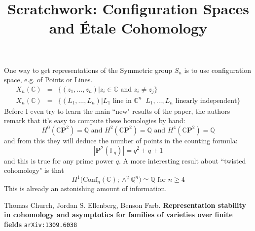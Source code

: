 \documentclass[12pt]{article}
\title{Scratchwork: Configuration Spaces and \'{E}tale Cohomology}
\date{}
\begin{document}
\sffamily

\maketitle

\noindent One way to get representations of the Symmetric group $S_n$ is to use configuration space, e.g. of Points or Lines.
\begin{eqnarray*}
X_n(\mathbb{C}) &=& \big\{ (z_1, \dots, z_n) \big| z_i \in \mathbb{C} \text{ and } z_i \neq z_j\big\} \\
X_n(\mathbb{C}) &=& \big\{ (L_1, \dots, L_n) \big| L_1 \text{ line in } \mathbb{C}^n \;\; L_1, \dots, L_n \text{ linearly independent} \big\} 
\end{eqnarray*}
Before I even try to learn the main ``new" results of the paper, the authors remark that it's easy to compute these homologies by hand:
$$ H^0(\mathbb{C}\mathbf{P}^2)= \mathbb{Q} \text{ and }
H^2(\mathbb{C}\mathbf{P}^2)= \mathbb{Q} \text{ and }
H^4(\mathbb{C}\mathbf{P}^2)= \mathbb{Q} $$
and from this they will deduce the number of points in the counting formula:
$$ |\mathbf{P}^2(\mathbb{F}_q)| = q^2 + q + 1  $$
and this is true for any prime power $q$.   A more interesting result about ``twisted cohomology" is that
$$ H^1\big(\text{Conf}_n(\mathbb{C}); \wedge^2 \mathbb{Q}^n \big) \simeq \mathbb{Q} \text{ for }n \geq 4 $$
This is already an astonishing amount of information.
\vfill

\begin{thebibliography}{}

\item Thomas Church, Jordan S. Ellenberg, Benson Farb. \textbf{Representation stability in cohomology and asymptotics for families of varieties over finite fields} \texttt{arXiv:1309.6038}

\end{thebibliography}
\end{document}
